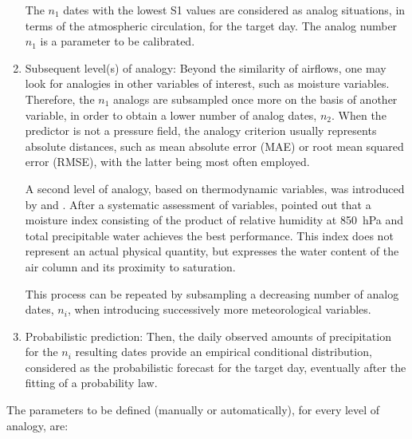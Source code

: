 \documentclass{ametsoc}
\begin{document}
\begin{enumerate}
	The $n_{1}$ dates with the lowest S1 values are considered as analog situations, in terms of the atmospheric circulation, for the target day. The analog number $n_{1}$ is a parameter to be calibrated.
	
	\item Subsequent level(s) of analogy: Beyond the similarity of airflows, one may look for analogies in other variables of interest, such as moisture variables. Therefore, the $n_{1}$ analogs are subsampled once more on the basis of another variable, in order to obtain a lower number of analog dates, $n_{2}$. When the predictor is not a pressure field, the analogy criterion usually represents absolute distances, such as mean absolute error (MAE) or root mean squared error (RMSE), with the latter being most often employed.
	
	A second level of analogy, based on thermodynamic variables, was introduced by \citet{Vallee1986} and \citet{Gibergans-Baguena2007}. After a systematic assessment of variables, \citet{Bontron2004} pointed out that a moisture index consisting of the product of relative humidity at 850~hPa and total precipitable water achieves the best performance. This index does not represent an actual physical quantity, but expresses the water content of the air column and its proximity to saturation.
	
	This process can be repeated by subsampling a decreasing number of analog dates, $n_{i}$, when introducing successively more meteorological variables.
	
	\item Probabilistic prediction: Then, the daily observed amounts of precipitation for the $n_{i}$ resulting dates provide an empirical conditional distribution, considered as the probabilistic forecast for the target day, eventually after the fitting of a probability law.
	
\end{enumerate}

The parameters to be defined (manually or automatically), for every level of analogy, are:
\end{document}
